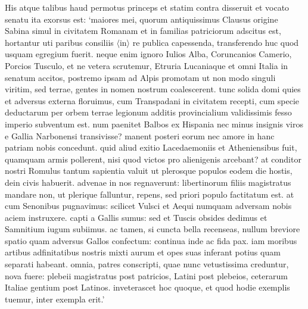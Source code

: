 His atque talibus haud permotus princeps et statim contra disseruit et vocato senatu ita exorsus est: `maiores mei, quorum antiquissimus Clausus origine Sabina simul in
civitatem Romanam et in familias patriciorum adscitus est,
hortantur uti paribus consiliis $\langle$in$\rangle$ re publica capessenda,
transferendo huc quod usquam egregium fuerit. neque enim
ignoro Iulios Alba, Coruncanios Camerio, Porcios Tusculo,
et ne vetera scrutemur, Etruria Lucaniaque et omni Italia
in senatum accitos, postremo ipsam ad Alpis promotam ut
non modo singuli viritim, sed terrae, gentes in nomen
nostrum coalescerent. tunc solida domi quies et adversus
externa floruimus, cum Transpadani in civitatem recepti,  
cum specie deductarum per orbem terrae legionum additis
provincialium validissimis fesso imperio subventum est. num
paenitet Balbos ex Hispania nec minus insignis viros e Gallia
Narbonensi transivisse? manent posteri eorum nec amore in
hanc patriam nobis concedunt. quid aliud exitio Lacedaemoniis et Atheniensibus fuit, quamquam armis pollerent,
nisi quod victos pro alienigenis arcebant? at conditor nostri
Romulus tantum sapientia valuit ut plerosque populos eodem
die hostis, dein civis habuerit. advenae in nos regnaverunt:
libertinorum filiis magistratus mandare non, ut plerique
falluntur, repens, sed priori populo factitatum est. at cum
Senonibus pugnavimus: scilicet Vulsci et Aequi numquam
adversam nobis aciem instruxere. capti a Gallis sumus:
sed et Tuscis obsides dedimus et Samnitium iugum subiimus.
ac tamen, si cuncta bella recenseas, nullum breviore spatio
quam adversus Gallos confectum: continua inde ac fida pax.
iam moribus artibus adfinitatibus nostris mixti aurum et opes
suas inferant potius quam separati habeant. omnia, patres
conscripti, quae nunc vetustissima creduntur, nova fuere:
plebeii magistratus post patricios, Latini post plebeios,
ceterarum Italiae gentium post Latinos. inveterascet hoc
quoque, et quod hodie exemplis tuemur, inter exempla
erit.'
